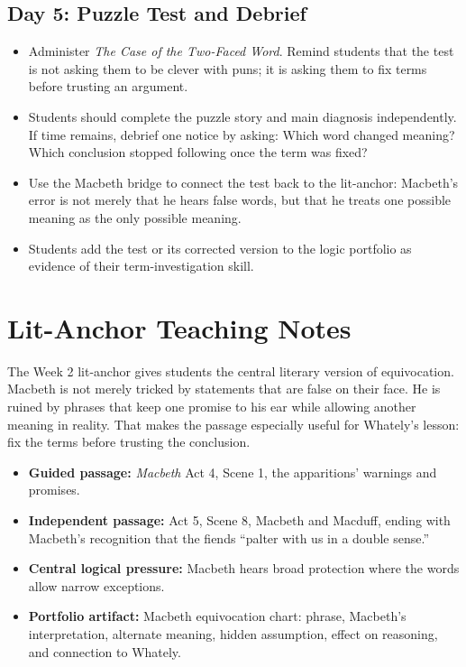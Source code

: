 \documentclass[12pt]{article}
\begin{document}
\subsection*{Day 5: Puzzle Test and Debrief}
\begin{itemize}[leftmargin=*]
\item Administer \textit{The Case of the Two-Faced Word}. Remind students that the test is not asking them to be clever with puns; it is asking them to fix terms before trusting an argument.
\item Students should complete the puzzle story and main diagnosis independently. If time remains, debrief one notice by asking: Which word changed meaning? Which conclusion stopped following once the term was fixed?
\item Use the Macbeth bridge to connect the test back to the lit-anchor: Macbeth's error is not merely that he hears false words, but that he treats one possible meaning as the only possible meaning.
\item Students add the test or its corrected version to the logic portfolio as evidence of their term-investigation skill.
\end{itemize}

\section*{Lit-Anchor Teaching Notes}
The Week 2 lit-anchor gives students the central literary version of equivocation. Macbeth is not merely tricked by statements that are false on their face. He is ruined by phrases that keep one promise to his ear while allowing another meaning in reality. That makes the passage especially useful for Whately's lesson: fix the terms before trusting the conclusion.

\begin{itemize}[leftmargin=*]
\item \textbf{Guided passage:} \textit{Macbeth} Act 4, Scene 1, the apparitions' warnings and promises.
\item \textbf{Independent passage:} Act 5, Scene 8, Macbeth and Macduff, ending with Macbeth's recognition that the fiends ``palter with us in a double sense.''
\item \textbf{Central logical pressure:} Macbeth hears broad protection where the words allow narrow exceptions.
\item \textbf{Portfolio artifact:} Macbeth equivocation chart: phrase, Macbeth's interpretation, alternate meaning, hidden assumption, effect on reasoning, and connection to Whately.
\end{itemize}
\end{document}
